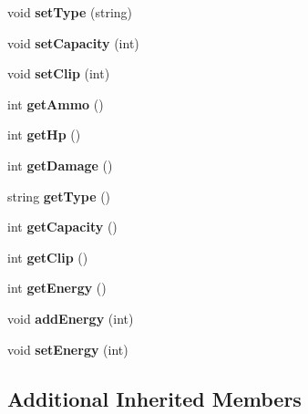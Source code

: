 \begin{DoxyCompactItemize}
void {\bfseries set\+Type} (string)
\item 
\mbox{\label{classFlakCannon_a7c3e713da2af2ae576a97c9ade518c0c}} 
void {\bfseries set\+Capacity} (int)
\item 
\mbox{\label{classFlakCannon_a88efc0d72b906a15344526c21fb89228}} 
void {\bfseries set\+Clip} (int)
\item 
\mbox{\label{classFlakCannon_ad749f55d7e1e61760ed0ff72aecd8ce9}} 
int {\bfseries get\+Ammo} ()
\item 
\mbox{\label{classFlakCannon_a406fc7781dba8758523e343f633dcce4}} 
int {\bfseries get\+Hp} ()
\item 
\mbox{\label{classFlakCannon_a83d840c087c2ab7fa017e9043ba4b2b1}} 
int {\bfseries get\+Damage} ()
\item 
\mbox{\label{classFlakCannon_a9a3d59c79aca4e07f0da874a062343bb}} 
string {\bfseries get\+Type} ()
\item 
\mbox{\label{classFlakCannon_a408d6c37c505d8aa39ceec366378d239}} 
int {\bfseries get\+Capacity} ()
\item 
\mbox{\label{classFlakCannon_a55d92ae747f283979229b885ce883758}} 
int {\bfseries get\+Clip} ()
\item 
\mbox{\label{classFlakCannon_a29222741b5d8a22054171c77db3312e8}} 
int {\bfseries get\+Energy} ()
\item 
\mbox{\label{classFlakCannon_ad0937ece15ad6ac3934ed7204db1bb54}} 
void {\bfseries add\+Energy} (int)
\item 
\mbox{\label{classFlakCannon_a776a9b98dfe8d71b8f8d6412296c3f22}} 
void {\bfseries set\+Energy} (int)
\end{DoxyCompactItemize}
\subsection*{Additional Inherited Members}


